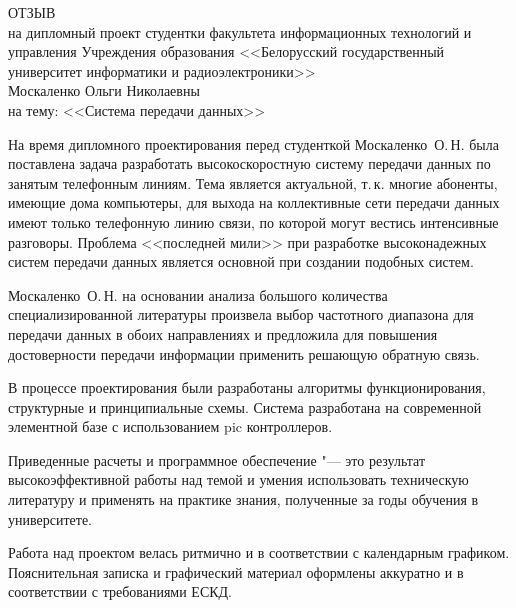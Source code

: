 
\thispagestyle{empty}

\begin{singlespace}

{\small
  \begin{center}
    \begin{minipage}{0.8\textwidth}
      \begin{center}
        {\normalsize ОТЗЫВ}\\[1em]
        на дипломный проект студентки факультета информационных технологий
        и управления Учреждения образования <<Белорусский государственный университет информатики и радиоэлектроники>>\\
        Москаленко Ольги Николаевны \\
        на тему: <<Система передачи данных>>
      \end{center}
    \end{minipage}
  \end{center}

На время дипломного проектирования перед студенткой Москаленко~О.\,Н. была поставлена задача разработать высокоскоростную систему передачи данных по занятым телефонным линиям.
Тема является актуальной, т.\,к. многие абоненты, имеющие дома компьютеры, для выхода на коллективные сети передачи данных имеют только телефонную линию связи, по которой могут вестись интенсивные разговоры.
Проблема <<последней мили>> при разработке высоконадежных систем передачи данных является основной при создании подобных систем.

Москаленко~О.\,Н. на основании анализа большого количества специализированной литературы произвела выбор частотного диапазона для передачи данных в обоих направлениях и предложила для повышения достоверности передачи информации применить решающую обратную связь.

В процессе проектирования были разработаны алгоритмы функционирования, структурные и принципиальные схемы.
Система разработана на современной элементной базе с использованием pic контроллеров.

Приведенные расчеты и программное обеспечение "--- это результат высокоэффективной работы над темой и умения использовать техническую литературу и применять на практике знания, полученные за годы обучения в университете.

Работа над проектом велась ритмично и в соответствии с календарным графиком.
Пояснительная записка и графический материал оформлены аккуратно и в соответствии с требованиями ЕСКД.

}
\end{singlespace}
